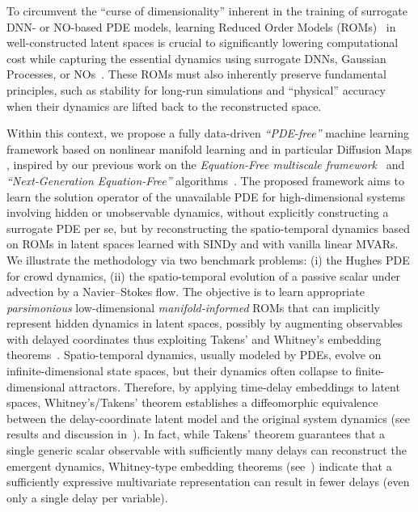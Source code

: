 \documentclass{article}
\begin{document}
To circumvent the ``curse of dimensionality'' inherent in the training of surrogate DNN- or NO-based PDE models, learning Reduced Order Models (ROMs)~\cite{schilders2008model,quarteroni2014reduced} in well-constructed latent spaces is crucial to significantly lowering computational cost while capturing the essential dynamics using surrogate DNNs, Gaussian Processes, or NOs~\cite{papaioannou2022time,kemeth2022learning,evangelou2022double,kontolati2024learning,fabiani2024task}. These ROMs must also inherently preserve fundamental principles, such as stability for long-run simulations and ``physical'' accuracy when their dynamics are lifted back to the reconstructed space.

Within this context, we propose a fully data-driven \textit{``PDE-free''} machine learning framework based on nonlinear manifold learning and in particular Diffusion Maps \cite{coifman2005geometric,coifman2006diffusion}, inspired by our previous work on the \textit{Equation-Free multiscale framework}~\cite{kevrekidis2003equation} and \textit{``Next-Generation Equation-Free''} algorithms~\cite{arbabi2021particles,kemeth2022learning,papaioannou2022time,Patsatzis_2023,evangelou2022parameter,Kevrekidis_DM,koronaki2024nonlinear,alvarez2025next,sroczynski2024learning}. The proposed framework aims to learn the solution operator of the unavailable PDE for high-dimensional systems involving hidden or unobservable dynamics, without explicitly constructing a surrogate PDE per se, but by reconstructing the spatio-temporal dynamics based on ROMs in latent spaces learned with SINDy and with vanilla linear MVARs. We illustrate the methodology via two benchmark problems: (i) the Hughes PDE for crowd dynamics, (ii) the spatio-temporal evolution of a passive scalar under advection by a Navier–Stokes flow. The objective is to learn appropriate \textit{parsimonious} low-dimensional \textit{manifold-informed} ROMs that can implicitly represent hidden dynamics in latent spaces, possibly by augmenting observables with delayed coordinates thus exploiting Takens’ and Whitney’s embedding theorems~\cite{sauer1991embedology}. Spatio-temporal dynamics, usually modeled by PDEs, evolve on infinite-dimensional state spaces, but their dynamics often collapse to finite-dimensional attractors. Therefore, by applying time-delay embeddings to latent spaces, Whitney’s/Takens’ theorem establishes a diffeomorphic equivalence between the delay-coordinate latent model and the original system dynamics (see results and discussion in~\cite{sauer1991embedology,rico1992discrete,krischer1993model,shvartsman1998low,shvartsman2000order,papaioannou2022time,dylewsky2022principal,kemeth2022learning,axaas2023model,gallos2024data,patil2025separation}). In fact, while Takens’ theorem guarantees that a single generic scalar observable with sufficiently many delays can reconstruct the emergent dynamics, Whitney-type embedding theorems (see~\cite{sauer1991embedology}) indicate that a sufficiently expressive multivariate representation can result in fewer delays (even only a single delay per variable).
\end{document}
